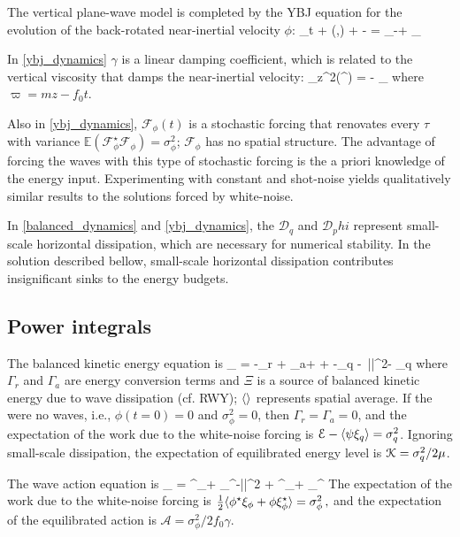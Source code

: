 \documentclass[12pt]{article}
\newcommand{\F}{\mathcal{F}}
\newcommand{\D}{\mathcal{D}}
\newcommand{\phis}{\phi^\star}
\newcommand{\A}{  \mathcal{A}}
\newcommand{\E}{\mathcal{E}}
\newcommand{\disp}{\eta}
\newcommand{\ze}{\zeta}
\newcommand{\Es}{\mathbb{E}}
\newcommand{\p}{\partial}
\begin{document}
The vertical plane-wave model is completed by the YBJ equation for the evolution
of the back-rotated near-inertial velocity $\phi$:
\beq
\phi_t + \sJ(\psi,\phi) +  \phi {}\ze -  \disp \lap \phi
 = \xi_\phi -\gamma \phi + \D_\phi\per
 \label{ybj_dynamics}
\eeq

In \eqref{ybj_dynamics}  $\gamma$
is a linear damping coefficient, which is related to the vertical viscosity
that damps the near-inertial velocity:
\beq
\nu \p_z^2(\phi \ee^{\ii \varpi}) = - _{ \gamma}\phi\com
\eeq
where $\varpi = mz - f_0 t$.

Also in \eqref{ybj_dynamics}, $\F_\phi(t)$ is a stochastic forcing that renovates
every $\tau$ with variance $\Es(\F_\phis\F_\phi) = \sigma_\phi^2$; $\F_\phi$ has
no spatial structure. The advantage of forcing the waves with this type of stochastic
forcing is the a priori knowledge of the energy input. Experimenting with constant
and shot-noise yields  qualitatively similar results to the solutions forced by
white-noise.

In \eqref{balanced_dynamics} and \eqref{ybj_dynamics}, the $\D_q$ and $\D_phi$ represent
small-scale horizontal dissipation, which are necessary for numerical stability.
In the solution described bellow, small-scale horizontal dissipation contributes
insignificant sinks to the energy budgets.


\subsection{Power integrals}

The balanced kinetic energy equation is
\beq
{} \underbrace{\half \la |\nabla \psi|^2 \ra}_{ \K} = -\la\Gamma_r + \Gamma_a\ra + \Xi +
 -\la \psi \xi_q \ra -\ \mu \la|\nabla\psi|^2\ra - \la\psi\D_q\ra\com
\label{Ke}
\eeq
where $\Gamma_r$ and $\Gamma_a$ are energy conversion terms and $\Xi$ is a source of balanced kinetic energy
due to wave dissipation (cf. RWY); $\langle \rangle$ represents spatial average.
If the were no waves, i.e., $\phi(t=0)=0$ and $\sigma_\phi^2=0$,  then $\Gamma_r=\Gamma_a = 0$, and the expectation of the work due to the white-noise forcing
is $\E-\la\psi\xi_q\ra = \sigma_q^2$. Ignoring small-scale dissipation, the expectation of equilibrated energy level
is $\mathcal{K} = \sigma_q^2/2\mu$.

The wave action equation is
\beq
{} _{ \A} = \la \phis \xi_\phi +
\phi \xi_\phis \ra -\gamma \la |\phi|^2 \ra +  \la \phis\D_\phi + \phi\D_\phis \ra\per
\label{A}
\eeq
The expectation of the work due to the white-noise forcing is $ \tfrac{1}{2}\la \phis \xi_\phi+\phi \xi_\phis \ra = \sigma_\phi^2\com$
and the expectation of the equilibrated action is $\A = \sigma_\phi^2/2f_0\gamma$.
\end{document}
